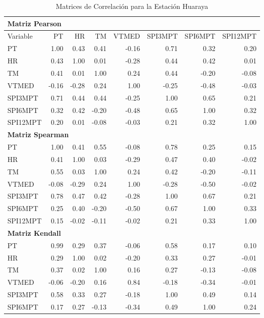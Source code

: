 \begin{table}[ht]
\centering
\caption{Matrices de Correlación para la Estación Huaraya}
\begin{tabular}{lrrrrrrr}
\toprule
\multicolumn{8}{l}{\textbf{Matriz Pearson}} \\
\midrule
Variable & PT & HR & TM & VTMED & SPI3MPT & SPI6MPT & SPI12MPT \\
\midrule
PT       & 1.00 & 0.43 & 0.41 & -0.16 & 0.71 & 0.32 & 0.20 \\
HR       & 0.43 & 1.00 & 0.01 & -0.28 & 0.44 & 0.42 & 0.01 \\
TM       & 0.41 & 0.01 & 1.00 & 0.24 & 0.44 & -0.20 & -0.08 \\
VTMED    & -0.16 & -0.28 & 0.24 & 1.00 & -0.25 & -0.48 & -0.03 \\
SPI3MPT  & 0.71 & 0.44 & 0.44 & -0.25 & 1.00 & 0.65 & 0.21 \\
SPI6MPT  & 0.32 & 0.42 & -0.20 & -0.48 & 0.65 & 1.00 & 0.32 \\
SPI12MPT & 0.20 & 0.01 & -0.08 & -0.03 & 0.21 & 0.32 & 1.00 \\
\midrule
\multicolumn{8}{l}{\textbf{Matriz Spearman}} \\
\midrule
PT       & 1.00 & 0.41 & 0.55 & -0.08 & 0.78 & 0.25 & 0.15 \\
HR       & 0.41 & 1.00 & 0.03 & -0.29 & 0.47 & 0.40 & -0.02 \\
TM       & 0.55 & 0.03 & 1.00 & 0.24 & 0.42 & -0.20 & -0.11 \\
VTMED    & -0.08 & -0.29 & 0.24 & 1.00 & -0.28 & -0.50 & -0.02 \\
SPI3MPT  & 0.78 & 0.47 & 0.42 & -0.28 & 1.00 & 0.67 & 0.21 \\
SPI6MPT  & 0.25 & 0.40 & -0.20 & -0.50 & 0.67 & 1.00 & 0.33 \\
SPI12MPT & 0.15 & -0.02 & -0.11 & -0.02 & 0.21 & 0.33 & 1.00 \\
\midrule
\multicolumn{8}{l}{\textbf{Matriz Kendall}} \\
\midrule
PT       & 0.99 & 0.29 & 0.37 & -0.06 & 0.58 & 0.17 & 0.10 \\
HR       & 0.29 & 1.00 & 0.02 & -0.20 & 0.33 & 0.27 & -0.01 \\
TM       & 0.37 & 0.02 & 1.00 & 0.16 & 0.27 & -0.13 & -0.08 \\
VTMED    & -0.06 & -0.20 & 0.16 & 0.84 & -0.18 & -0.34 & -0.01 \\
SPI3MPT  & 0.58 & 0.33 & 0.27 & -0.18 & 1.00 & 0.49 & 0.14 \\
SPI6MPT  & 0.17 & 0.27 & -0.13 & -0.34 & 0.49 & 1.00 & 0.24 \\

\end{tabular}
\end{table}
